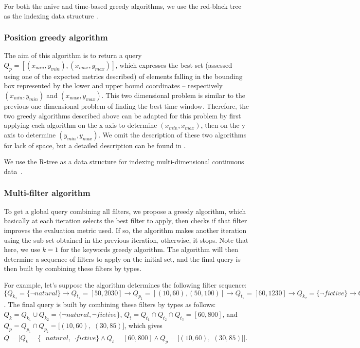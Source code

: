 For both the naive and time-based greedy algorithms, we use the red-black tree as the indexing data structure \cite{Guibas1978}.


\subsubsection{Position greedy algorithm} The aim of this algorithm is to return a query $Q_p=[(x_{min},y_{min}),(x_{max},y_{max})]$, which expresses the best set (assessed using one of the expected metrics described) of elements falling in the bounding box represented by the  lower and upper bound coordinates -- respectively $(x_{min},y_{min})$ and $(x_{max},y_{max})$. This two dimensional problem is similar to the previous one dimensional problem of finding the best time window. Therefore, the two greedy algorithms described above can be adapted for this problem by first applying each algorithm on the x-axis to determine $(x_{min},x_{max})$, then on the y-axis to determine $(y_{min},y_{max})$.  We omit the description of these two algorithms for lack of space, but a detailed description can be found in \cite{Bouadjenek2018}.

We use the R-tree as a data structure for indexing multi-dimensional continuous data~\cite{Guttman1984}.


\subsubsection{Multi-filter algorithm} To get a global query combining all filters, we propose a greedy algorithm, which basically at each iteration selects the best filter to apply, then checks if that filter improves the evaluation metric used. If so, the algorithm makes another iteration using the sub-set obtained in the previous iteration, otherwise, it stops. Note that here, we use  $k=1$ for the keywords greedy algorithm. The algorithm will then determine a sequence of filters to apply on the initial set, and the final query is then built by combining these filters by types.


For example, let's suppose the algorithm determines the following filter sequence: $\{Q_{k_1}=\{ \neg natural\} \to Q_{t_1}=[50,2030] \to Q_{p_1}=[(10,60), (50,100)] \to Q_{t_2}=[60,1230] \to Q_{k_2}=\{ \neg fictive\}  \to  Q_{p_2}=[(10,60), (30,85)] \to  Q_{t_3}=[60,800] \}$. 
The final query is built by combining these filters by types as follows: $Q_k=Q_{k_1} \cup Q_{k_2}=\{\neg natural,\neg fictive\}$, $Q_t =Q_{t_1} \cap Q_{t_2} \cap Q_{t_3}=[60,800]$, and  $ Q_p=Q_{p_1}  \cap Q_{p_2}=[(10,60),$ $(30,85)]$, which gives $Q=[Q_k=\{\neg natural,\neg fictive\}\wedge Q_t=[60,800]\wedge Q_p = [(10,60),$ $(30,85)]]$.

